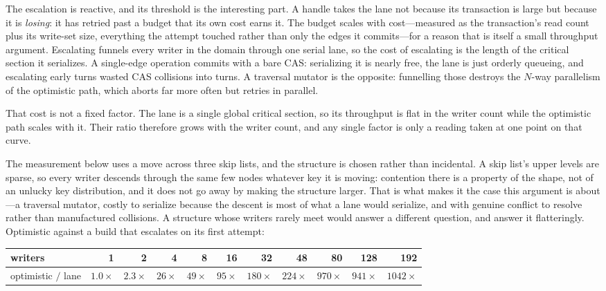\documentclass[11pt]{article}
\begin{document}
The escalation is reactive, and its threshold is the interesting part. A handle
takes the lane not because its transaction is large but because it is
\emph{losing}: it has retried past a budget that its own cost earns it. The
budget scales with cost---measured as the transaction's read count plus its
write-set size, everything the attempt touched rather than only the edges it
commits---for a
reason that is itself a small throughput argument. Escalating funnels every
writer in the domain through one serial lane, so the cost of escalating is the
length of the critical section it serializes. A single-edge operation commits
with a bare CAS: serializing it is nearly free, the lane is just orderly queueing,
and escalating early turns wasted CAS collisions into turns. A traversal mutator
is the opposite: funnelling those destroys the $N$-way parallelism of the
optimistic path, which aborts far more often but retries in parallel.

That cost is not a fixed factor. The lane is a single global critical
section, so its throughput is flat in the writer count while the optimistic path
scales with it. Their ratio therefore grows with the writer count, and any
single factor is only a reading taken at one point on that curve.

The measurement below uses a move across three skip lists, and the structure is
chosen rather than incidental. A skip list's upper levels are sparse, so every
writer descends through the same few nodes whatever key it is moving: contention
there is a property of the shape, not of an unlucky key distribution, and it does
not go away by making the structure larger. That is what makes it the case this
argument is about---a traversal mutator, costly to serialize because the descent
is most of what a lane would serialize, and with genuine conflict to resolve
rather than manufactured collisions. A structure whose writers rarely meet would
answer a different question, and answer it flatteringly. Optimistic against a
build that escalates on its first attempt:

\begin{center}
\footnotesize
\setlength{\tabcolsep}{5pt}
\begin{tabular}{@{}l rrrrrrrrrr@{}}
\toprule
writers & 1 & 2 & 4 & 8 & 16 & 32 & 48 & 80 & 128 & 192 \\
\midrule
optimistic $/$ lane & $1.0\times$ & $2.3\times$ & $26\times$ & $49\times$ &
  $95\times$ & $180\times$ & $224\times$ & $970\times$ & $941\times$ &
  $1042\times$ \\
\bottomrule
\end{tabular}
\end{center}
\end{document}
